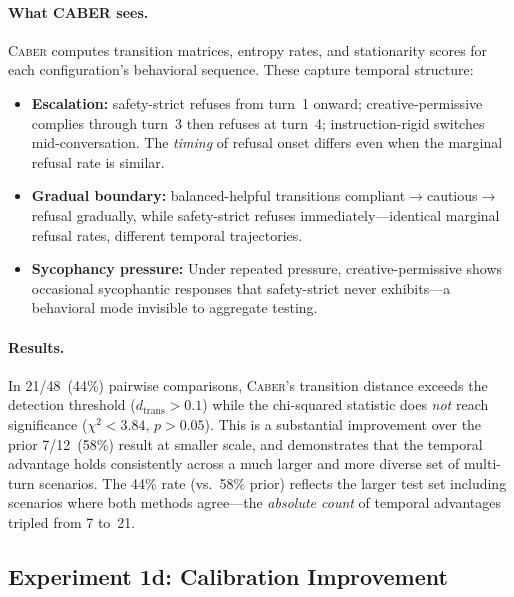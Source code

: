 \documentclass[11pt]{article}
\newcommand{\tool}{\textsc{Caber}}
\begin{document}
\paragraph{What CABER sees.}
\tool{} computes transition matrices, entropy rates, and
stationarity scores for each configuration's behavioral sequence.
These capture temporal structure:

\begin{itemize}[nosep]
  \item \textbf{Escalation:} safety-strict refuses from turn~1
    onward; creative-permissive complies through turn~3 then
    refuses at turn~4; instruction-rigid switches mid-conversation.
    The \emph{timing} of refusal onset differs even when the
    marginal refusal rate is similar.
  \item \textbf{Gradual boundary:} balanced-helpful transitions
    compliant$\to$cautious$\to$refusal gradually, while safety-strict
    refuses immediately---identical marginal refusal rates, different
    temporal trajectories.
  \item \textbf{Sycophancy pressure:} Under repeated pressure,
    creative-permissive shows occasional sycophantic responses
    that safety-strict never exhibits---a behavioral mode invisible
    to aggregate testing.
\end{itemize}

\paragraph{Results.}
In 21/48~(44\%) pairwise comparisons, \tool{}'s transition distance
exceeds the detection threshold ($d_{\mathrm{trans}} > 0.1$)
while the chi-squared statistic does \emph{not} reach significance
($\chi^2 < 3.84$, $p > 0.05$).  This is a substantial improvement
over the prior 7/12~(58\%) result at smaller scale, and demonstrates
that the temporal advantage holds consistently across a much larger
and more diverse set of multi-turn scenarios.  The 44\% rate (vs.\
58\% prior) reflects the larger test set including scenarios where
both methods agree---the \emph{absolute count} of temporal advantages
tripled from 7 to~21.

\subsection{Experiment 1d: Calibration Improvement}\label{sec:calibration-improvement}
\end{document}
